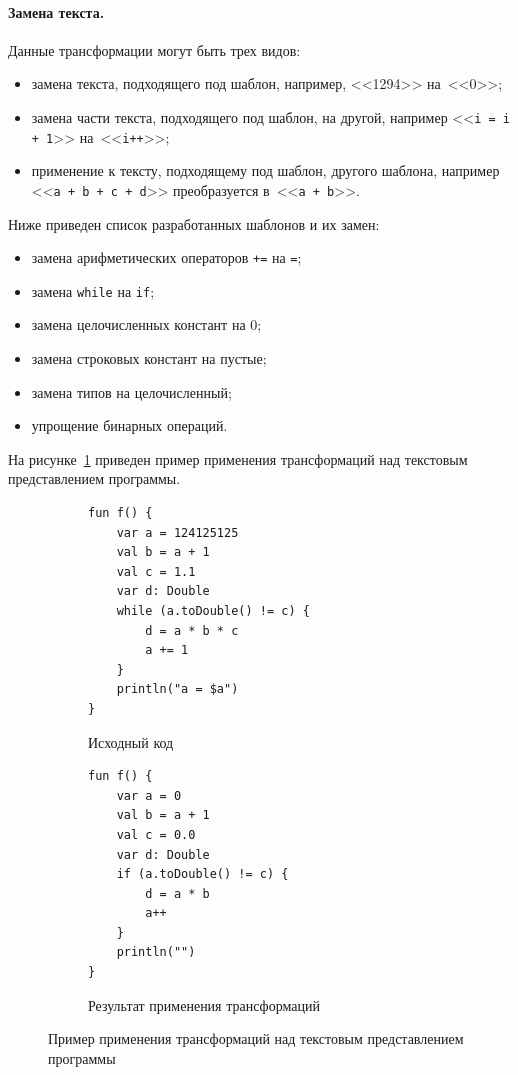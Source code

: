 \paragraph{Замена текста.}
Данные трансформации могут быть трех видов:
%
\begin{itemize}
	\item замена текста, подходящего под шаблон, например, <<1294>> на~<<0>>; 
	\item замена части текста, подходящего под шаблон, на другой, например <<\texttt{i = i + 1}>> на~<<\texttt{i++}>>;
	\item применение к тексту, подходящему под шаблон, другого шаблона, например <<\texttt{a + b + c + d}>> преобразуется в~<<\texttt{a + b}>>.
\end{itemize}
%
Ниже приведен список разработанных шаблонов и их замен:
%
\begin{itemize}
	\item замена арифметических операторов \texttt{+=} на \texttt{=};
	\item замена \texttt{while} на \texttt{if};
	\item замена целочисленных констант на 0;
	\item замена строковых констант на пустые;
	\item замена типов на целочисленный;
	\item упрощение бинарных операций.
\end{itemize}
%
На рисунке~\ref{ex:peephole} приведен пример применения трансформаций над текстовым представлением программы.
%
\begin{figure}[]
\centering
\begin{subfigure}[t]{\linewidth}
\begin{lstlisting}
fun f() {
    var a = 124125125
    val b = a + 1
    val c = 1.1
    var d: Double
    while (a.toDouble() != c) {
        d = a * b * c
        a += 1
    }
    println("a = $a")
}
\end{lstlisting}
\caption{Исходный код}
\end{subfigure}
\begin{subfigure}[t]{\linewidth}
\begin{lstlisting}
fun f() {
    var a = 0
    val b = a + 1
    val c = 0.0
    var d: Double
    if (a.toDouble() != c) {
        d = a * b
        a++
    }
    println("")
}
\end{lstlisting}
\caption{Результат применения трансформаций}
\end{subfigure}
\caption{\label{ex:peephole}Пример применения трансформаций над текстовым представлением программы}
\end{figure}

